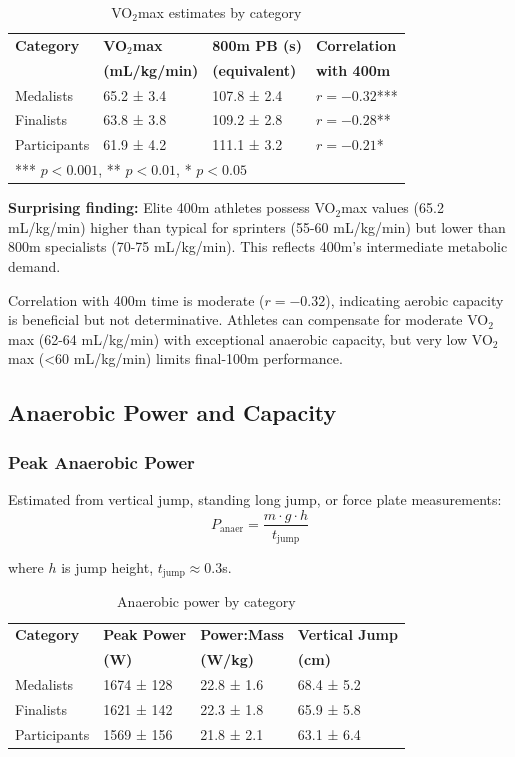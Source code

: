 \begin{table}[H]
\centering
\caption{VO$_2$max estimates by category}
\begin{tabular}{@{}llll@{}}
\toprule
\textbf{Category} & \textbf{VO$_2$max} & \textbf{800m PB (s)} & \textbf{Correlation} \\
 & \textbf{(mL/kg/min)} & \textbf{(equivalent)} & \textbf{with 400m} \\
\midrule
Medalists & 65.2 ± 3.4 & 107.8 ± 2.4 & $r = -0.32$*** \\
Finalists & 63.8 ± 3.8 & 109.2 ± 2.8 & $r = -0.28$** \\
Participants & 61.9 ± 4.2 & 111.1 ± 3.2 & $r = -0.21$* \\
\bottomrule
\multicolumn{4}{l}{\small{*** $p < 0.001$, ** $p < 0.01$, * $p < 0.05$}}
\end{tabular}
\end{table}

\textbf{Surprising finding:} Elite 400m athletes possess VO$_2$max values (65.2 mL/kg/min) higher than typical for sprinters (55-60 mL/kg/min) but lower than 800m specialists (70-75 mL/kg/min). This reflects 400m's intermediate metabolic demand.

Correlation with 400m time is moderate ($r = -0.32$), indicating aerobic capacity is beneficial but not determinative. Athletes can compensate for moderate VO$_2$max (62-64 mL/kg/min) with exceptional anaerobic capacity, but very low VO$_2$max (<60 mL/kg/min) limits final-100m performance.

\subsection{Anaerobic Power and Capacity}

\subsubsection{Peak Anaerobic Power}

Estimated from vertical jump, standing long jump, or force plate measurements:
\begin{equation}
P_{\text{anaer}} = \frac{m \cdot g \cdot h}{t_{\text{jump}}}
\end{equation}

where $h$ is jump height, $t_{\text{jump}} \approx 0.3$s.

\begin{table}[H]
\centering
\caption{Anaerobic power by category}
\begin{tabular}{@{}llll@{}}
\toprule
\textbf{Category} & \textbf{Peak Power} & \textbf{Power:Mass} & \textbf{Vertical Jump} \\
 & \textbf{(W)} & \textbf{(W/kg)} & \textbf{(cm)} \\
\midrule
Medalists & 1674 ± 128 & 22.8 ± 1.6 & 68.4 ± 5.2 \\
Finalists & 1621 ± 142 & 22.3 ± 1.8 & 65.9 ± 5.8 \\
Participants & 1569 ± 156 & 21.8 ± 2.1 & 63.1 ± 6.4 \\
\bottomrule
\end{tabular}
\end{table}

